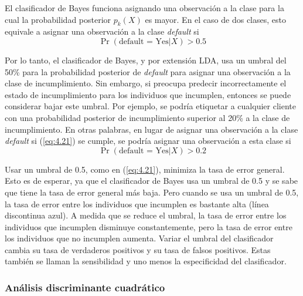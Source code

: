 El clasificador de Bayes funciona asignando una observación a la clase para la cual la probabilidad posterior $p_k(X)$ es mayor. En el caso de dos clases, esto equivale a asignar una observación a la clase \textit{default} si
\begin{equation}
\Pr(\text{default = Yes} | X) > 0.5
\label{eq:4.21}
\end{equation}

Por lo tanto, el clasificador de Bayes, y por extensión LDA, usa un umbral del 50\% para la probabilidad posterior de \textit{default} para asignar una observación a la clase de incumplimiento. Sin embargo, si preocupa predecir incorrectamente el estado de incumplimiento para los individuos que incumplen, entonces se puede considerar bajar este umbral. Por ejemplo, se podría etiquetar a cualquier cliente con una probabilidad posterior de incumplimiento superior al 20\% a la clase de incumplimiento. En otras palabras, en lugar de asignar una observación a la clase \textit{default} si (\ref{eq:4.21}) se cumple, se podría asignar una observación a esta clase si
\begin{equation}
\Pr(\text{default = Yes} | X) > 0.2
\label{eq:4.22}
\end{equation}

Usar un umbral de 0.5, como en (\ref{eq:4.21}), minimiza la tasa de error general. Esto es de esperar, ya que el clasificador de Bayes usa un umbral de 0.5 y se sabe que tiene la tasa de error general más baja. Pero cuando se usa un umbral de 0.5, la tasa de error entre los individuos que incumplen es bastante alta (línea discontinua azul). A medida que se reduce el umbral, la tasa de error entre los individuos que incumplen disminuye constantemente, pero la tasa de error entre los individuos que no incumplen aumenta. Variar el umbral del clasificador cambia su tasa de verdaderos positivos y su tasa de falsos positivos. Estas también se llaman la sensibilidad y uno menos la especificidad del clasificador. \\
\subsubsection{Análisis discriminante cuadrático}

